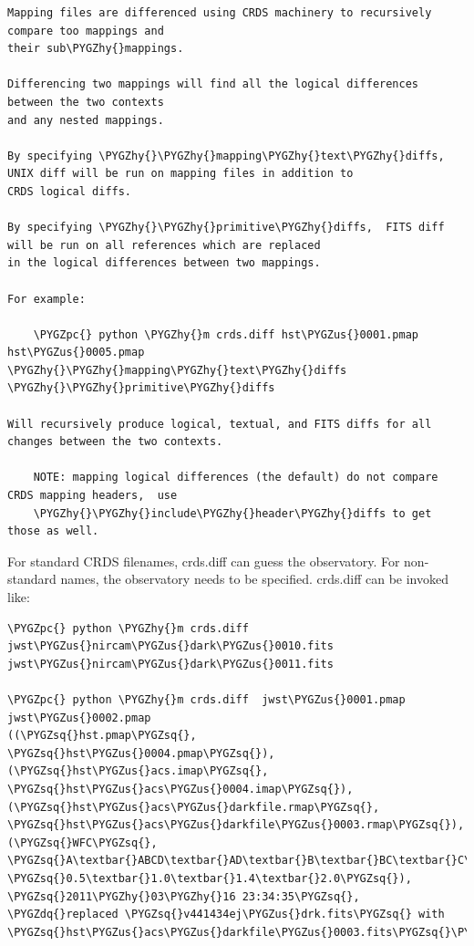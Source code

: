 \documentclass[letterpaper,10pt,english]{sphinxmanual}
\def\PYGZus{\char`\_}
\def\PYGZpc{\char`\%}
\def\PYGZhy{\char`\-}
\def\PYGZsq{\char`\'}
\def\PYGZdq{\char`\"}
\begin{document}
\begin{Verbatim}[commandchars=\\\{\}]
Mapping files are differenced using CRDS machinery to recursively compare too mappings and
their sub\PYGZhy{}mappings.

Differencing two mappings will find all the logical differences between the two contexts
and any nested mappings.

By specifying \PYGZhy{}\PYGZhy{}mapping\PYGZhy{}text\PYGZhy{}diffs,  UNIX diff will be run on mapping files in addition to
CRDS logical diffs.

By specifying \PYGZhy{}\PYGZhy{}primitive\PYGZhy{}diffs,  FITS diff will be run on all references which are replaced
in the logical differences between two mappings.

For example:

    \PYGZpc{} python \PYGZhy{}m crds.diff hst\PYGZus{}0001.pmap  hst\PYGZus{}0005.pmap  \PYGZhy{}\PYGZhy{}mapping\PYGZhy{}text\PYGZhy{}diffs \PYGZhy{}\PYGZhy{}primitive\PYGZhy{}diffs

Will recursively produce logical, textual, and FITS diffs for all changes between the two contexts.

    NOTE: mapping logical differences (the default) do not compare CRDS mapping headers,  use
    \PYGZhy{}\PYGZhy{}include\PYGZhy{}header\PYGZhy{}diffs to get those as well.
\end{Verbatim}

For standard CRDS filenames,  crds.diff can guess the observatory.   For
non-standard names,  the observatory needs to be specified.  crds.diff can be
invoked like:

\begin{Verbatim}[commandchars=\\\{\}]
\PYGZpc{} python \PYGZhy{}m crds.diff   jwst\PYGZus{}nircam\PYGZus{}dark\PYGZus{}0010.fits  jwst\PYGZus{}nircam\PYGZus{}dark\PYGZus{}0011.fits

\PYGZpc{} python \PYGZhy{}m crds.diff  jwst\PYGZus{}0001.pmap   jwst\PYGZus{}0002.pmap
((\PYGZsq{}hst.pmap\PYGZsq{}, \PYGZsq{}hst\PYGZus{}0004.pmap\PYGZsq{}), (\PYGZsq{}hst\PYGZus{}acs.imap\PYGZsq{}, \PYGZsq{}hst\PYGZus{}acs\PYGZus{}0004.imap\PYGZsq{}), (\PYGZsq{}hst\PYGZus{}acs\PYGZus{}darkfile.rmap\PYGZsq{}, \PYGZsq{}hst\PYGZus{}acs\PYGZus{}darkfile\PYGZus{}0003.rmap\PYGZsq{}), (\PYGZsq{}WFC\PYGZsq{}, \PYGZsq{}A\textbar{}ABCD\textbar{}AD\textbar{}B\textbar{}BC\textbar{}C\textbar{}D\PYGZsq{}, \PYGZsq{}0.5\textbar{}1.0\textbar{}1.4\textbar{}2.0\PYGZsq{}), \PYGZsq{}2011\PYGZhy{}03\PYGZhy{}16 23:34:35\PYGZsq{}, \PYGZdq{}replaced \PYGZsq{}v441434ej\PYGZus{}drk.fits\PYGZsq{} with \PYGZsq{}hst\PYGZus{}acs\PYGZus{}darkfile\PYGZus{}0003.fits\PYGZsq{}\PYGZdq{})
\end{Verbatim}
\end{document}
